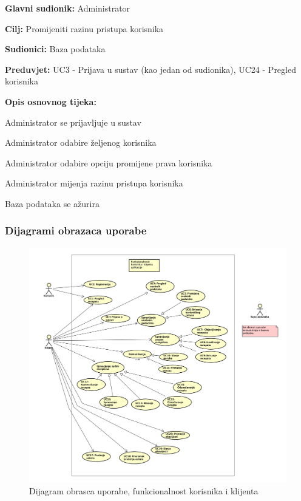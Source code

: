 					\noindent {}
					\begin{packed_item}
	
						\item \textbf{Glavni sudionik: } Administrator
						\item  \textbf{Cilj:} Promijeniti razinu pristupa korisnika
						\item  \textbf{Sudionici:} Baza podataka
						\item  \textbf{Preduvjet:} UC3 - Prijava u sustav (kao jedan od sudionika), UC24 - Pregled korisnika
						\item  \textbf{Opis osnovnog tijeka:}
						
						\item[] \begin{packed_enum}
							
							\item Administrator se prijavljuje u sustav
							\item Administrator odabire željenog korisnika
							\item Administrator odabire opciju promijene prava korisnika
							\item Administrator mijenja razinu pristupa korisnika
							\item Baza podataka se ažurira
						\end{packed_enum}
					\end{packed_item}
				
					
			\subsubsection{Dijagrami obrazaca uporabe}
				\begin{figure}[H]
					\includegraphics[scale=0.3]{dijagrami/Korisnik_klijent.png} 
					\centering
					\caption{Dijagram obrasca uporabe, funkcionalnost korisnika i klijenta}
					\label{fig:korisnik-klijent}
				\end{figure}
				\eject

